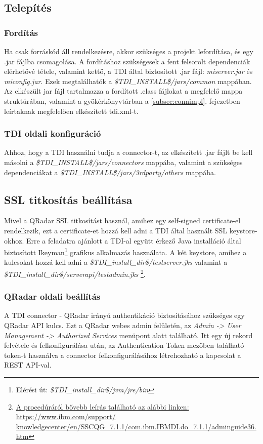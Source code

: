 \subsection{Telepítés}

\subsubsection{Fordítás}
Ha csak forráskód áll rendelkezésre, akkor szükséges a projekt lefordítása, és egy .jar fájlba csomagolása. A fordításhoz szükségesek a fent felsorolt dependenciák elérhetővé tétele, valamint kettő, a TDI által biztosított .jar fájl: \textit{miserver.jar} és \textit{miconfig.jar}. Ezek megtalálhatók a \textit{\$TDI\_INSTALL\$/jars/common} mappában. 
Az elkészült jar fájl tartalmazza a fordított .class fájlokat a megfelelő mappa struktúrában, valamint a gyökérkönyvtárban a \ref{subsec:connimpl}. fejezetben leírtaknak megfelelően elkészített tdi.xml-t.
\subsubsection{TDI oldali konfiguráció}
Ahhoz, hogy a TDI használni tudja a connector-t, az elkészített .jar fájlt be kell másolni a \textit{\$TDI\_INSTALL\$/jars/connectors} mappába, valamint a szükséges dependenciákat a \textit{\$TDI\_INSTALL\$/jars/3rdparty/others} mappába.

\subsection{SSL titkosítás beállítása}
Mivel a QRadar SSL titkosítást használ, amihez egy self-signed certificate-el rendelkezik, ezt a certificate-et hozzá kell adni a TDI által használt SSL keystore-okhoz. Erre a feladatra ajánlott a TDI-al együtt érkező Java installáció által biztosított Ikeyman\footnote{Elérési út: \textit{\$TDI\_install\_dir\$/jvm/jre/bin}} grafikus alkalmazás használata. A két keystore, amihez a kulcsokat hozzá kell adni a \textit{\$TDI\_install\_dir\$/testserver.jks} valamint a \textit{\$TDI\_install\_dir\$/serverapi/testadmin.jks} \footnote{\href{https://www.ibm.com/support/knowledgecenter/en/SSCQG\_7.1.1/com.ibm.IBMDI.do\_7.1.1/adminguide36.htm}{A procedúráról bővebb leírás található az alábbi linken: https://www.ibm.com/support/ knowledgecenter/en/SSCQG\_7.1.1/com.ibm.IBMDI.do\_7.1.1/adminguide36.htm}}.

\subsubsection{QRadar oldali beállítás}
A TDI connector - QRadar irányú authentikáció biztosításához szükséges egy QRadar API kulcs. Ezt a QRadar webes admin felületén, az \textit{Admin -> User Management -> Authorized Services} menüpont alatt található. Itt egy új rekord felvétele és felkonfigurálása után, az Authentication Token mezőben található token-t használva a connector felkonfigurálásához létrehozható a kapcsolat a REST API-val. 

